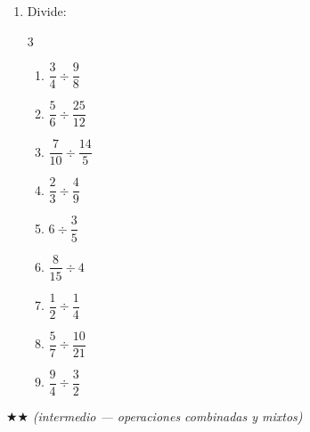 \documentclass[11pt, letterpaper]{article}
\begin{document}
\begin{enumerate}[label=\textbf{\arabic*.}, leftmargin=*]
\item Divide:
\begin{multicols}{3}
\begin{enumerate}[label=\alph*)]
  \item $\dfrac{3}{4}\div\dfrac{9}{8}$
  \item $\dfrac{5}{6}\div\dfrac{25}{12}$
  \item $\dfrac{7}{10}\div\dfrac{14}{5}$
  \item $\dfrac{2}{3}\div\dfrac{4}{9}$
  \item $6\div\dfrac{3}{5}$
  \item $\dfrac{8}{15}\div4$
  \item $\dfrac{1}{2}\div\dfrac{1}{4}$
  \item $\dfrac{5}{7}\div\dfrac{10}{21}$
  \item $\dfrac{9}{4}\div\dfrac{3}{2}$
\end{enumerate}
\end{multicols}

\end{enumerate}

$\bigstar\bigstar$ \textit{(intermedio --- operaciones combinadas y mixtos)}
\end{document}
